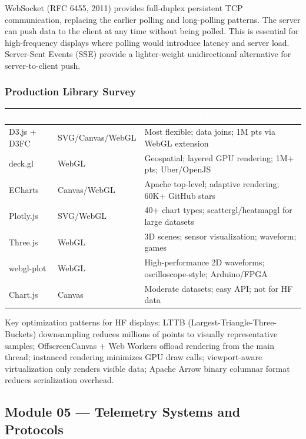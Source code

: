 \documentclass[11pt,letterpaper]{article}
\newcommand{\tableheader}[1]{\textbf{\sffamily\textcolor{white}{#1}}}
\begin{document}
WebSocket (RFC 6455, 2011) provides full-duplex persistent TCP communication, replacing the earlier polling and long-polling patterns. The server can push data to the client at any time without being polled. This is essential for high-frequency displays where polling would introduce latency and server load. Server-Sent Events (SSE) provide a lighter-weight unidirectional alternative for server-to-client push.

\subsubsection{Production Library Survey}

\begin{center}
\begin{tabularx}{\textwidth}{L{2.5cm}L{2cm}X}
\toprule
{}
\tableheader{Library} & \tableheader{Renderer} & \tableheader{Strengths and Use Cases} \\
\midrule
D3.js + D3FC & SVG/Canvas/WebGL & Most flexible; data joins; 1M pts via WebGL extension \\
deck.gl & WebGL & Geospatial; layered GPU rendering; 1M+ pts; Uber/OpenJS \\
ECharts & Canvas/WebGL & Apache top-level; adaptive rendering; 60K+ GitHub stars \\
Plotly.js & SVG/WebGL & 40+ chart types; scattergl/heatmapgl for large datasets \\
Three.js & WebGL & 3D scenes; sensor visualization; waveform; games \\
webgl-plot & WebGL & High-performance 2D waveforms; oscilloscope-style; Arduino/FPGA \\
Chart.js & Canvas & Moderate datasets; easy API; not for HF data \\
\bottomrule
\end{tabularx}
\end{center}

Key optimization patterns for HF displays: LTTB (Largest-Triangle-Three-Buckets) downsampling reduces millions of points to visually representative samples; OffscreenCanvas + Web Workers offload rendering from the main thread; instanced rendering minimizes GPU draw calls; viewport-aware virtualization only renders visible data; Apache Arrow binary columnar format reduces serialization overhead.

\subsection{Module 05 --- Telemetry Systems and Protocols}
\end{document}
